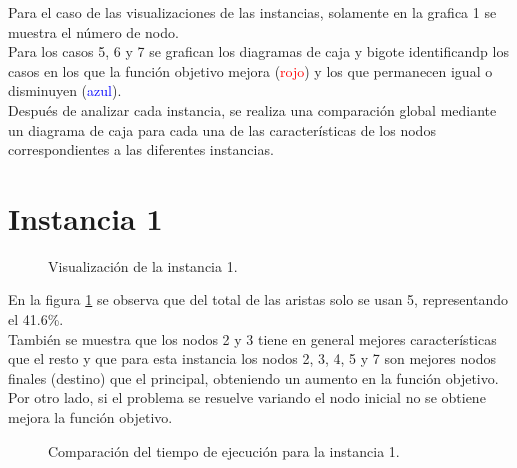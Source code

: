 \documentclass[12pt]{article}
\begin{document}
Para el caso de las visualizaciones de las instancias, solamente en la grafica 1 se muestra el número de nodo. \\

Para los casos 5, 6 y 7 se grafican los diagramas de caja y bigote identificandp los casos en los que la función objetivo mejora (\textcolor{red}{rojo}) y los que permanecen igual o disminuyen (\textcolor{blue}{azul}). \\

Después de analizar cada instancia, se realiza una comparación global mediante un diagrama de caja para cada una de las características de los nodos correspondientes a las diferentes instancias. 

\newpage
\section*{Instancia 1}

\begin{figure}[H]
\centering
{}

\caption{Visualización de la instancia 1.} \label{f2}
\end{figure}

En la figura \ref{f2} se observa que del total de las aristas solo se usan 5, representando el 41.6\%. \\

También se muestra que los nodos 2 y 3 tiene en general mejores características que el resto y que para esta instancia los nodos 2, 3, 4, 5 y 7 son mejores nodos finales (destino) que el principal, obteniendo un aumento en la función objetivo. \\

Por otro lado, si el problema se resuelve variando el nodo inicial no se obtiene mejora la función objetivo.

\newpage

\begin{figure}[H]
\centering
{}

\caption{Comparación del tiempo de ejecución para la instancia 1.} \label{f3}
\end{figure}
\end{document}
